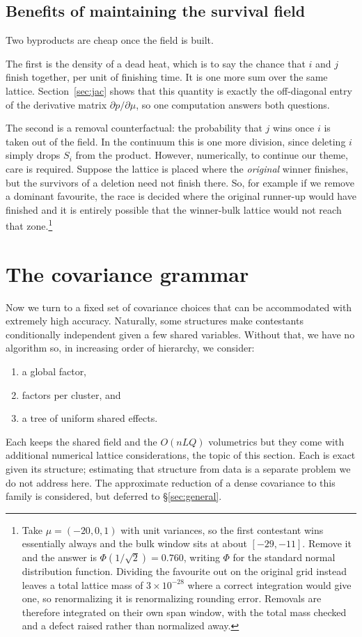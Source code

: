 \documentclass[11pt]{article}
\begin{document}
\subsection{Benefits of maintaining the survival field}

Two byproducts are cheap once the field is built.

The first is the density of a dead heat, which is to say the chance that $i$ and $j$
finish together, per unit of finishing time. It is one more sum over the
same lattice. Section~\ref{sec:jac} shows that this quantity is exactly
the off-diagonal entry of the derivative matrix $\partial p/\partial\mu$,
so one computation answers both questions.

The second is a removal counterfactual: the probability that $j$ wins
once $i$ is taken out of the field. In the continuum this is one more
division, since deleting $i$ simply drops $S_i$ from the product. However, numerically, to continue our theme, care is required. Suppose the lattice is placed where the
\emph{original} winner finishes, but the survivors of a deletion need not
finish there. So, for example if we remove a dominant favourite, the race is decided where the original runner-up would have finished and it is entirely possible that the winner-bulk lattice would not reach that zone.\footnote{
Take $\mu=(-20,0,1)$ with unit variances, so the first contestant wins
essentially always and the bulk window sits at about $[-29,-11]$. Remove
it and the answer is $\Phi(1/\sqrt2)=0.760$, writing $\Phi$ for the
standard normal distribution function. Dividing the favourite out on the
original grid instead leaves a total lattice mass of $3\times10^{-28}$
where a correct integration would give one, so renormalizing it is
renormalizing rounding error. Removals are therefore integrated on their
own span window, with the total mass checked and a defect raised rather
than normalized away.}



\section{The covariance grammar}\label{sec:grammar}

Now we turn to a fixed set of covariance choices that can be accommodated with extremely high accuracy. Naturally, some structures make contestants conditionally independent given a few shared variables. Without that, we have no algorithm so, in increasing order of hierarchy, we consider:
\begin{enumerate}
\item a global factor,
\item factors per cluster, and
\item a tree of uniform shared effects.
\end{enumerate}
Each keeps the shared
field and the $O(nLQ)$ volumetrics but they come with additional numerical lattice considerations, the topic of this section. Each is exact given its structure;
estimating that structure from data is a separate problem we do not address
here. The approximate reduction of a dense covariance to this family is considered, but deferred to \S\ref{sec:general}.
\end{document}
